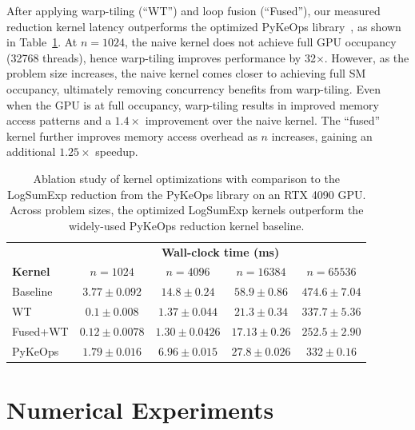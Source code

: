 \documentclass[10pt]{article}
\theoremstyle{plain}
\theoremstyle{definition}
\theoremstyle{remark}
\begin{document}
After applying warp-tiling (``WT'') and loop fusion (``Fused''), our measured reduction kernel latency outperforms the optimized PyKeOps library~\cite{charlier2021kernel}, as shown in Table~\ref{tab:kernel_comparison}. At $n=1024$, the naive kernel does not achieve full GPU occupancy (32768 threads), hence warp-tiling improves performance by 32$\times$. However, as the problem size increases, the naive kernel comes closer to achieving full SM occupancy, ultimately removing concurrency benefits from warp-tiling. Even when the GPU is at full occupancy, warp-tiling results in improved memory access patterns and a $1.4\times$ improvement over the naive kernel. The ``fused'' kernel further improves memory access overhead as $n$ increases, gaining an additional $1.25\times$ speedup. 
\begin{table}[t]
    \caption{Ablation study of kernel optimizations with comparison to the LogSumExp reduction from the PyKeOps library on an RTX 4090 GPU. Across problem sizes, the optimized LogSumExp kernels outperform the widely-used PyKeOps reduction kernel baseline.}
    \label{tab:kernel_comparison}
\footnotesize
    \centering
\begin{tabular}{lcccc}
\toprule
&\multicolumn{4}{c}{\textbf{Wall-clock time (ms)}}\\
 \textbf{Kernel}  & $n=1024$ & $n=4096$ & $n=16384$ & $n=65536$ \\
\midrule
Baseline &  $3.77\pm 0.092$ & $14.8\pm 0.24$ & $58.9\pm 0.86$ & $474.6\pm 7.04$ \\
WT &  $\bm{0.1\pm0.008}$ & $1.37\pm0.044$ & $21.3\pm0.34$ & $337.7\pm5.36$ \\
Fused+WT &  $0.12\pm 0.0078$ & $\bm{1.30\pm 0.0426}$ & $\bm{17.13\pm 0.26}$ & $\bm{252.5\pm 2.90}$ \\
PyKeOps &  $1.79\pm0.016$ & $6.96\pm 0.015$ & $27.8\pm 0.026$ & $332\pm 0.16$ \\
\bottomrule
\end{tabular}
\end{table}


\section{Numerical Experiments}\label{sec:numerical}
\end{document}
